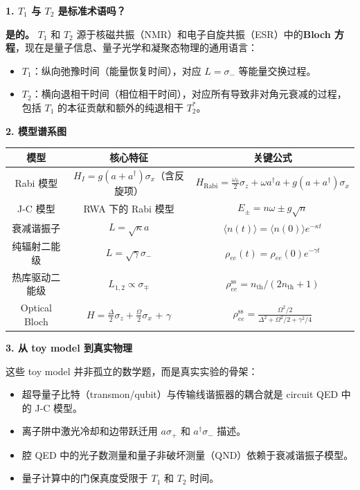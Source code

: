\begin{insightbox}[举一反三与物理直觉]
\textbf{1. $T_1$ 与 $T_2$ 是标准术语吗？}

\textbf{是的。} $T_1$ 和 $T_2$ 源于核磁共振（NMR）和电子自旋共振（ESR）中的\textbf{Bloch 方程}，现在是量子信息、量子光学和凝聚态物理的通用语言：
\begin{itemize}[nosep]
    \item $T_1$：纵向弛豫时间（能量恢复时间），对应 $L=\sigma_-$ 等能量交换过程。
    \item $T_2$：横向退相干时间（相位相干时间），对应所有导致非对角元衰减的过程，包括 $T_1$ 的本征贡献和额外的纯退相干 $T_2^*$。
\end{itemize}

\textbf{2. 模型谱系图}

\begin{center}
\renewcommand{\arraystretch}{1.3}
\begin{tabular}{|c|c|c|}
\hline
\textbf{模型} & \textbf{核心特征} & \textbf{关键公式} \\
\hline
Rabi 模型 & $H_I = g(a+a^\dagger)\sigma_x$（含反旋项） & $H_{\text{Rabi}} = \frac{\omega_0}{2}\sigma_z + \omega a^\dagger a + g(a+a^\dagger)\sigma_x$ \\
\hline
J-C 模型 & RWA 下的 Rabi 模型 & $E_\pm = n\omega \pm g\sqrt{n}$ \\
\hline
衰减谐振子 & $L=\sqrt{\kappa}a$ & $\langle n(t)\rangle = \langle n(0)\rangle e^{-\kappa t}$ \\
\hline
纯辐射二能级 & $L=\sqrt{\gamma}\sigma_-$ & $\rho_{ee}(t)=\rho_{ee}(0)e^{-\gamma t}$ \\
\hline
热库驱动二能级 & $L_{1,2}\propto \sigma_\mp$ & $\rho_{ee}^{\text{ss}} = n_{\text{th}}/(2n_{\text{th}}+1)$ \\
\hline
Optical Bloch & $H=\frac{\Delta}{2}\sigma_z+\frac{\Omega}{2}\sigma_x$ + $\gamma$ & $\rho_{ee}^{\text{ss}} = \frac{\Omega^2/2}{\Delta^2+\Omega^2/2+\gamma^2/4}$ \\
\hline
\end{tabular}
\end{center}

\textbf{3. 从 toy model 到真实物理}

这些 toy model 并非孤立的数学题，而是真实实验的骨架：
\begin{itemize}[nosep]
    \item 超导量子比特（transmon/qubit）与传输线谐振器的耦合就是 circuit QED 中的 J-C 模型。
    \item 离子阱中激光冷却和边带跃迁用 $a\sigma_+$ 和 $a^\dagger\sigma_-$ 描述。
    \item 腔 QED 中的光子数测量和量子非破坏测量（QND）依赖于衰减谐振子模型。
    \item 量子计算中的门保真度受限于 $T_1$ 和 $T_2$ 时间。
\end{itemize}
\end{insightbox}


